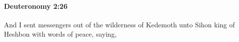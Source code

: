 
		\paragraph{Deuteronomy 2:26} %
			\label{DEUTERONOMY-2-26}

			And I sent messengers out of the wilderness of Kedemoth unto Sihon king of Heshbon with words of peace, saying,


